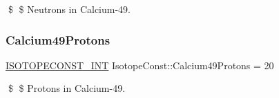 \$ \$ Neutrons in Calcium-\/49. \mbox{\label{group___isotope_const-_calcium-_ca49_gacabbec065ac66148f8aea344dbf8311b}} 
\subsubsection{\texorpdfstring{Calcium49\+Protons}{Calcium49Protons}}
{\footnotesize\ttfamily \mbox{\hyperlink{group___isotope_const-_macros_ga5f18360b3e99483a35c32d789e62621c}{I\+S\+O\+T\+O\+P\+E\+C\+O\+N\+S\+T\+\_\+\+I\+NT}} Isotope\+Const\+::\+Calcium49\+Protons = 20}

\$ \$ Protons in Calcium-\/49. 